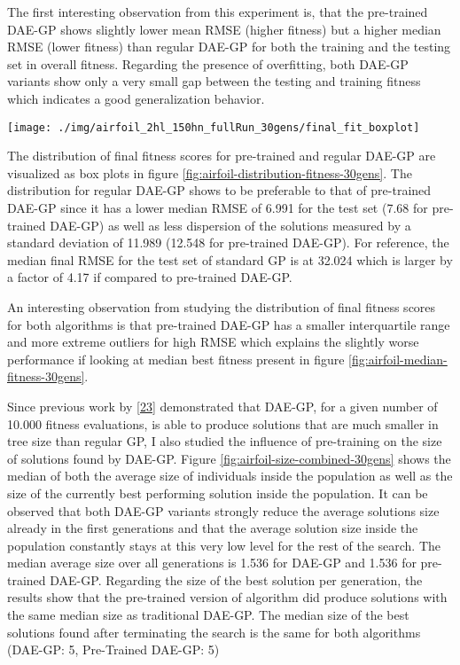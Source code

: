 \documentclass[
  11pt,
]{article}
\let\origfigure\figure
\let\endorigfigure\endfigure
\renewenvironment{figure}[1][2] {
    \expandafter\origfigure\expandafter[H]
} {
    \endorigfigure
}
\begin{document}
The first interesting observation from this experiment is, that the pre-trained DAE-GP shows slightly lower mean RMSE (higher fitness) but a higher median RMSE (lower fitness) than regular DAE-GP for both the training and the testing set in overall fitness. Regarding the presence of overfitting, both DAE-GP variants show only a very small gap between the testing and training fitness which indicates a good generalization behavior.

\begin{figure}[c]

{\centering \texttt{[image: ./img/airfoil\_2hl\_150hn\_fullRun\_30gens/final\_fit\_boxplot]} 

}

\caption{Best Fitness after 30 Generations - Airfoil}\label{fig:airfoil-distribution-fitness-30gens}
\end{figure}

The distribution of final fitness scores for pre-trained and regular DAE-GP are visualized as box plots in figure \ref{fig:airfoil-distribution-fitness-30gens}. The distribution for regular DAE-GP shows to be preferable to that of pre-trained DAE-GP since it has a lower median RMSE of 6.991 for the test set (7.68 for pre-trained DAE-GP) as well as less dispersion of the solutions measured by a standard deviation of 11.989 (12.548 for pre-trained DAE-GP). For reference, the median final RMSE for the test set of standard GP is at 32.024 which is larger by a factor of 4.17 if compared to pre-trained DAE-GP.

An interesting observation from studying the distribution of final fitness scores for both algorithms is that pre-trained DAE-GP has a smaller interquartile range and more extreme outliers for high RMSE which explains the slightly worse performance if looking at median best fitness present in figure \ref{fig:airfoil-median-fitness-30gens}.

Since previous work by {[}\protect\hyperlink{ref-dae-gp_2022_symreg}{23}{]} demonstrated that DAE-GP, for a given number of 10.000 fitness evaluations, is able to produce solutions that are much smaller in tree size than regular GP, I also studied the influence of pre-training on the size of solutions found by DAE-GP. Figure \ref{fig:airfoil-size-combined-30gens} shows the median of both the average size of individuals inside the population as well as the size of the currently best performing solution inside the population. It can be observed that both DAE-GP variants strongly reduce the average solutions size already in the first generations and that the average solution size inside the population constantly stays at this very low level for the rest of the search. The median average size over all generations is 1.536 for DAE-GP and 1.536 for pre-trained DAE-GP. Regarding the size of the best solution per generation, the results show that the pre-trained version of algorithm did produce solutions with the same median size as traditional DAE-GP. The median size of the best solutions found after terminating the search is the same for both algorithms (DAE-GP: 5, Pre-Trained DAE-GP: 5)
\end{document}

